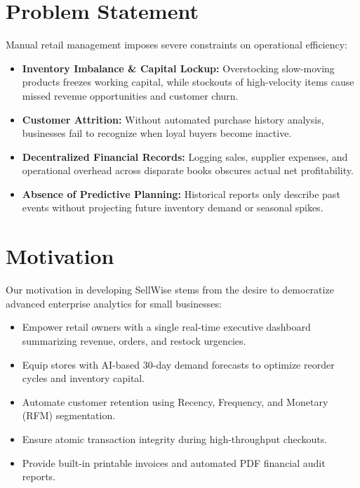 \documentclass[12pt,a4paper]{report}
\begin{document}
\section{Problem Statement}
Manual retail management imposes severe constraints on operational efficiency:
\begin{itemize}
    \item \textbf{Inventory Imbalance \& Capital Lockup:} Overstocking slow-moving products freezes working capital, while stockouts of high-velocity items cause missed revenue opportunities and customer churn.
    \item \textbf{Customer Attrition:} Without automated purchase history analysis, businesses fail to recognize when loyal buyers become inactive.
    \item \textbf{Decentralized Financial Records:} Logging sales, supplier expenses, and operational overhead across disparate books obscures actual net profitability.
    \item \textbf{Absence of Predictive Planning:} Historical reports only describe past events without projecting future inventory demand or seasonal spikes.
\end{itemize}

\section{Motivation}
Our motivation in developing SellWise stems from the desire to democratize advanced enterprise analytics for small businesses:
\begin{itemize}
    \item Empower retail owners with a single real-time executive dashboard summarizing revenue, orders, and restock urgencies.
    \item Equip stores with AI-based 30-day demand forecasts to optimize reorder cycles and inventory capital.
    \item Automate customer retention using Recency, Frequency, and Monetary (RFM) segmentation.
    \item Ensure atomic transaction integrity during high-throughput checkouts.
    \item Provide built-in printable invoices and automated PDF financial audit reports.
\end{itemize}
\end{document}
